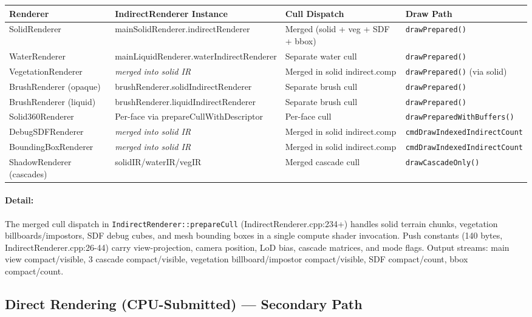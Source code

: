 \documentclass[11pt,a4paper]{article}
\begin{document}
\begin{longtable}{@{}llll@{}}
\toprule
\textbf{Renderer} & \textbf{IndirectRenderer Instance} & \textbf{Cull Dispatch} & \textbf{Draw Path} \\
\midrule
SolidRenderer & mainSolidRenderer.indirectRenderer & Merged (solid + veg + SDF + bbox) & \texttt{drawPrepared()} \\
WaterRenderer & mainLiquidRenderer.waterIndirectRenderer & Separate water cull & \texttt{drawPrepared()} \\
VegetationRenderer & \textit{merged into solid IR} & Merged in solid indirect.comp & \texttt{drawPrepared()} (via solid) \\
BrushRenderer (opaque) & brushRenderer.solidIndirectRenderer & Separate brush cull & \texttt{drawPrepared()} \\
BrushRenderer (liquid) & brushRenderer.liquidIndirectRenderer & Separate brush cull & \texttt{drawPrepared()} \\
Solid360Renderer & Per-face via prepareCullWithDescriptor & Per-face cull & \texttt{drawPreparedWithBuffers()} \\
DebugSDFRenderer & \textit{merged into solid IR} & Merged in solid indirect.comp & \texttt{cmdDrawIndexedIndirectCount} \\
BoundingBoxRenderer & \textit{merged into solid IR} & Merged in solid indirect.comp & \texttt{cmdDrawIndexedIndirectCount} \\
ShadowRenderer (cascades) & solidIR/waterIR/vegIR & Merged cascade cull & \texttt{drawCascadeOnly()} \\
\bottomrule
\end{longtable}

\paragraph{Detail:} The merged cull dispatch in \texttt{IndirectRenderer::prepareCull} (IndirectRenderer.cpp:234+) handles solid terrain chunks, vegetation billboards/impostors, SDF debug cubes, and mesh bounding boxes in a single compute shader invocation. Push constants (140 bytes, IndirectRenderer.cpp:26-44) carry view-projection, camera position, LoD bias, cascade matrices, and mode flags. Output streams: main view compact/visible, 3 cascade compact/visible, vegetation billboard/impostor compact/visible, SDF compact/count, bbox compact/count.

\subsection{Direct Rendering (CPU-Submitted) — Secondary Path}
\end{document}
